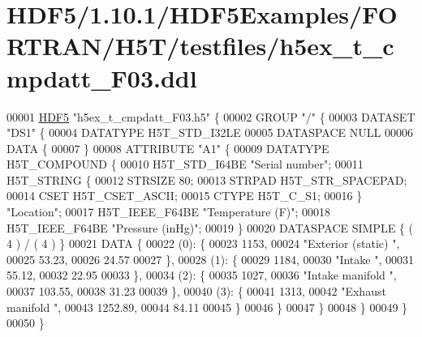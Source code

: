 \hypertarget{_h_d_f5_21_810_81_2_h_d_f5_examples_2_f_o_r_t_r_a_n_2_h5_t_2testfiles_2h5ex__t__cmpdatt___f03_8ddl_source}{}\section{H\+D\+F5/1.10.1/\+H\+D\+F5\+Examples/\+F\+O\+R\+T\+R\+A\+N/\+H5\+T/testfiles/h5ex\+\_\+t\+\_\+cmpdatt\+\_\+\+F03.ddl}
\label{_h_d_f5_21_810_81_2_h_d_f5_examples_2_f_o_r_t_r_a_n_2_h5_t_2testfiles_2h5ex__t__cmpdatt___f03_8ddl_source}

\begin{DoxyCode}
00001 \hyperlink{namespace_h_d_f5}{HDF5} \textcolor{stringliteral}{"h5ex\_t\_cmpdatt\_F03.h5"} \{
00002 GROUP \textcolor{stringliteral}{"/"} \{
00003    DATASET \textcolor{stringliteral}{"DS1"} \{
00004       DATATYPE  H5T\_STD\_I32LE
00005       DATASPACE  NULL
00006       DATA \{
00007       \}
00008       ATTRIBUTE \textcolor{stringliteral}{"A1"} \{
00009          DATATYPE  H5T\_COMPOUND \{
00010             H5T\_STD\_I64BE \textcolor{stringliteral}{"Serial number"};
00011             H5T\_STRING \{
00012                STRSIZE 80;
00013                STRPAD H5T\_STR\_SPACEPAD;
00014                CSET H5T\_CSET\_ASCII;
00015                CTYPE H5T\_C\_S1;
00016             \} \textcolor{stringliteral}{"Location"};
00017             H5T\_IEEE\_F64BE \textcolor{stringliteral}{"Temperature (F)"};
00018             H5T\_IEEE\_F64BE \textcolor{stringliteral}{"Pressure (inHg)"};
00019          \}
00020          DATASPACE  SIMPLE \{ ( 4 ) / ( 4 ) \}
00021          DATA \{
00022          (0): \{
00023                1153,
00024                \textcolor{stringliteral}{"Exterior (static)                                                               "},
00025                53.23,
00026                24.57
00027             \},
00028          (1): \{
00029                1184,
00030                \textcolor{stringliteral}{"Intake                                                                          "},
00031                55.12,
00032                22.95
00033             \},
00034          (2): \{
00035                1027,
00036                \textcolor{stringliteral}{"Intake manifold                                                                 "},
00037                103.55,
00038                31.23
00039             \},
00040          (3): \{
00041                1313,
00042                \textcolor{stringliteral}{"Exhaust manifold                                                                "},
00043                1252.89,
00044                84.11
00045             \}
00046          \}
00047       \}
00048    \}
00049 \}
00050 \}
\end{DoxyCode}
